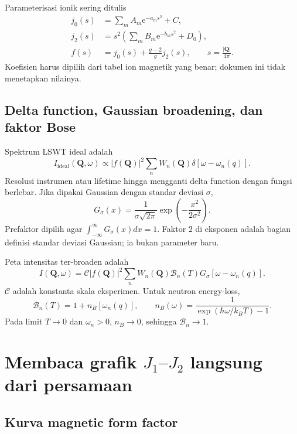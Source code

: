 \documentclass[11pt,a4paper]{article}
\newcommand{\ee}{\mathrm{e}}
\newcommand{\vQ}{\bm Q}
\begin{document}
Parameterisasi ionik sering ditulis
\begin{align}
j_0(s)&=\sum_m A_m\ee^{-a_ms^2}+C,\\
j_2(s)&=s^2\left(\sum_mB_m\ee^{-b_ms^2}+D_0\right),\\
f(s)&=j_0(s)+\frac{g-2}{g}j_2(s),
\qquad s=\frac{|\vQ|}{4\pi}.
\end{align}
Koefisien harus dipilih dari tabel ion magnetik yang benar; dokumen ini tidak menetapkan nilainya.

\subsection{Delta function, Gaussian broadening, dan faktor Bose}

Spektrum LSWT ideal adalah
\begin{equation}
I_{\mathrm{ideal}}(\vQ,\omega)
\propto|f(\vQ)|^2
\sum_nW_n(\vQ)
\delta[\omega-\omega_n(q)].
\label{eq:ideal-intensity}
\end{equation}
Resolusi instrumen atau lifetime hingga mengganti delta function dengan fungsi berlebar. Jika dipakai Gaussian dengan standar deviasi $\sigma$,
\begin{equation}
G_\sigma(x)=\frac1{\sigma\sqrt{2\pi}}
\exp\left(-\frac{x^2}{2\sigma^2}\right).
\label{eq:normalized-gaussian}
\end{equation}
Prefaktor dipilih agar $\int_{-\infty}^{\infty}G_\sigma(x)dx=1$. Faktor $2$ di eksponen adalah bagian definisi standar deviasi Gaussian; ia bukan parameter baru.

Peta intensitas ter-broaden adalah
\begin{equation}
\boxed{
I(\vQ,\omega)
=\mathcal C|f(\vQ)|^2
\sum_nW_n(\vQ)
\mathcal B_n(T)
G_\sigma[\omega-\omega_n(q)].}
\label{eq:final-intensity}
\end{equation}
$\mathcal C$ adalah konstanta skala eksperimen. Untuk neutron energy-loss,
\begin{equation}
\mathcal B_n(T)=1+n_B[\omega_n(q)],
\qquad
n_B(\omega)=\frac1{\exp(\hbar\omega/k_BT)-1}.
\end{equation}
Pada limit $T\to0$ dan $\omega_n>0$, $n_B\to0$, sehingga $\mathcal B_n\to1$.

\section{Membaca grafik \texorpdfstring{$J_1$--$J_2$}{J1--J2} langsung dari persamaan}

\subsection{Kurva magnetic form factor}
\end{document}
